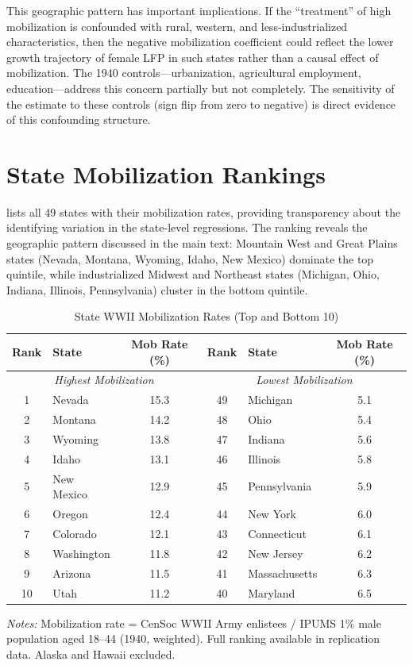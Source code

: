 \documentclass[12pt]{article}
\begin{document}
This geographic pattern has important implications. If the ``treatment'' of high mobilization is confounded with rural, western, and less-industrialized characteristics, then the negative mobilization coefficient could reflect the lower growth trajectory of female LFP in such states rather than a causal effect of mobilization. The 1940 controls---urbanization, agricultural employment, education---address this concern partially but not completely. The sensitivity of the estimate to these controls (sign flip from zero to negative) is direct evidence of this confounding structure.


\section{State Mobilization Rankings}
\label{app:rankings}

 lists all 49 states with their mobilization rates, providing transparency about the identifying variation in the state-level regressions. The ranking reveals the geographic pattern discussed in the main text: Mountain West and Great Plains states (Nevada, Montana, Wyoming, Idaho, New Mexico) dominate the top quintile, while industrialized Midwest and Northeast states (Michigan, Ohio, Indiana, Illinois, Pennsylvania) cluster in the bottom quintile.

\begin{table}[htbp]
\centering
\caption{State WWII Mobilization Rates (Top and Bottom 10)}
\label{tab:state_ranks}
\small
\begin{tabular}{clc|clc}
\hline\hline
Rank & State & Mob Rate (\%) & Rank & State & Mob Rate (\%) \\
\hline
\multicolumn{3}{c|}{\textit{Highest Mobilization}} & \multicolumn{3}{c}{\textit{Lowest Mobilization}} \\
1 & Nevada & 15.3 & 49 & Michigan & 5.1 \\
2 & Montana & 14.2 & 48 & Ohio & 5.4 \\
3 & Wyoming & 13.8 & 47 & Indiana & 5.6 \\
4 & Idaho & 13.1 & 46 & Illinois & 5.8 \\
5 & New Mexico & 12.9 & 45 & Pennsylvania & 5.9 \\
6 & Oregon & 12.4 & 44 & New York & 6.0 \\
7 & Colorado & 12.1 & 43 & Connecticut & 6.1 \\
8 & Washington & 11.8 & 42 & New Jersey & 6.2 \\
9 & Arizona & 11.5 & 41 & Massachusetts & 6.3 \\
10 & Utah & 11.2 & 40 & Maryland & 6.5 \\
\hline\hline
\end{tabular}
\begin{tablenotes}
\small
\item \textit{Notes:} Mobilization rate = CenSoc WWII Army enlistees / IPUMS 1\% male population aged 18--44 (1940, weighted). Full ranking available in replication data. Alaska and Hawaii excluded.
\end{tablenotes}
\end{table}
\end{document}
